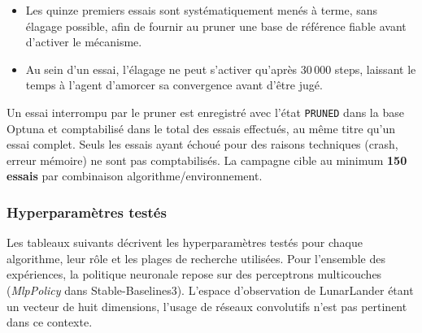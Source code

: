 \begin{itemize}
  \item Les quinze premiers essais sont systématiquement menés à terme, sans élagage possible, afin de fournir au pruner une base de référence fiable avant d'activer le mécanisme.
  \item Au sein d'un essai, l'élagage ne peut s'activer qu'après 30\,000 steps, laissant le temps à l'agent d'amorcer sa convergence avant d'être jugé.
\end{itemize}

Un essai interrompu par le pruner est enregistré avec l'état \texttt{PRUNED}
dans la base Optuna et comptabilisé dans le total des essais effectués, au
même titre qu'un essai complet. Seuls les essais ayant échoué pour des raisons
techniques (crash, erreur mémoire) ne sont pas comptabilisés. La campagne
cible au minimum \textbf{150 essais} par combinaison algorithme/environnement.

\subsubsection{Hyperparamètres testés}
\label{sec:hparams}

Les tableaux suivants décrivent les hyperparamètres testés pour chaque
algorithme, leur rôle et les plages de recherche utilisées. Pour l'ensemble
des expériences, la politique neuronale repose sur des perceptrons
multicouches (\textit{MlpPolicy} dans Stable-Baselines3). L'espace
d'observation de LunarLander étant un vecteur de huit dimensions, l'usage de
réseaux convolutifs n'est pas pertinent dans ce contexte.

\newlength{\hpColA}\setlength{\hpColA}{3.6cm}
\newlength{\hpColC}\setlength{\hpColC}{3.0cm}

